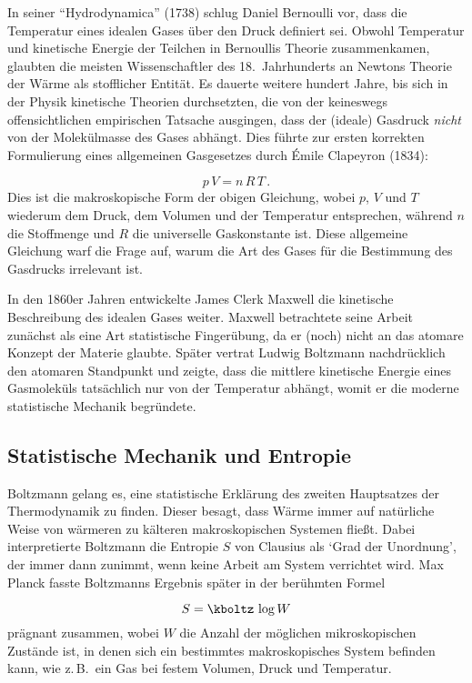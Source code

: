 In seiner \enquote{Hydrodynamica} (1738) schlug Daniel Bernoulli vor, dass die Temperatur eines idealen Gases über den Druck definiert sei. Obwohl Temperatur und kinetische Energie der Teilchen in Bernoullis Theorie zusammenkamen, glaubten die meisten Wissenschaftler des 18.\ Jahrhunderts an Newtons Theorie der Wärme als stofflicher Entität. Es dauerte weitere hundert Jahre, bis sich in der Physik kinetische Theorien durchsetzten, die von der keineswegs offensichtlichen empirischen Tatsache ausgingen, dass der (ideale) Gasdruck \emph{nicht} von der Molekülmasse des Gases abhängt. Dies führte zur ersten korrekten Formulierung eines allgemeinen Gasgesetzes durch Émile Clapeyron (1834):

\begin{equation*}\label{eq:ideal-nr}
  p\, V=n\, R\, T\,.
\end{equation*}
%
Dies ist die makroskopische Form der obigen Gleichung, wobei $p$, $V$ und $T$ wiederum dem Druck, dem Volumen und der Temperatur entsprechen, während $n$ die Stoffmenge und $R$ die universelle Gaskonstante ist. Diese allgemeine Gleichung warf die Frage auf, warum die Art des Gases für die Bestimmung des Gasdrucks irrelevant ist.

In den 1860er Jahren entwickelte James Clerk Maxwell die kinetische Beschreibung des idealen Gases weiter. Maxwell betrachtete seine Arbeit zunächst als eine Art statistische Fingerübung, da er (noch) nicht an das atomare Konzept der Materie glaubte. Später vertrat Ludwig Boltzmann nachdrücklich den atomaren Standpunkt und zeigte, dass die mittlere kinetische Energie eines Gasmoleküls tatsächlich nur von der Temperatur abhängt, womit er die moderne statistische Mechanik begründete.


\subsection*{Statistische Mechanik und Entropie}

Boltzmann gelang es, eine statistische Erklärung des zweiten Hauptsatzes der Thermodynamik zu finden. Dieser besagt, dass Wärme immer auf natürliche Weise von wärmeren zu kälteren makroskopischen Systemen fließt. Dabei interpretierte Boltzmann die Entropie $S$ von Clausius als \enquote*{Grad der Unordnung}, der immer dann zunimmt, wenn keine Arbeit am System verrichtet wird. Max Planck fasste Boltzmanns Ergebnis später in der berühmten Formel

\begin{equation*}\label{eq:ideal-nr}
  S=\kboltz\, \log W
\end{equation*}
%
prägnant zusammen, wobei $W$ die Anzahl der möglichen mikroskopischen Zustände ist, in denen sich ein bestimmtes makroskopisches System befinden kann, wie z.\,B.\ ein Gas bei festem Volumen, Druck und Temperatur.


